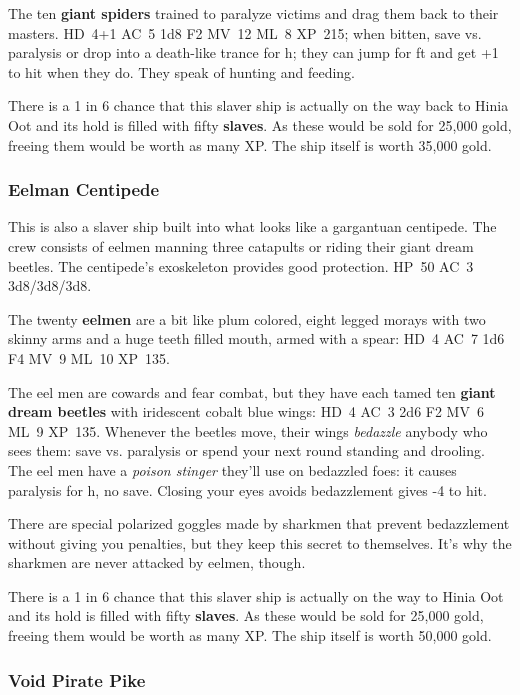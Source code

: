 \documentclass[11pt]{bxart}
\begin{document}
The ten \textbf{giant spiders} trained to paralyze victims and drag
them back to their masters. HD~4+1 AC~5 1d8 F2 MV~12 ML~8 XP~215; when
bitten, save vs. paralysis or drop into a death-like trance for \unit[6]{h};
they can jump for \unit[20]{ft} and get +1 to hit when they do. They speak of
hunting and feeding.

There is a 1 in 6 chance that this slaver ship is actually on the way
back to Hinia Oot and its hold is filled with fifty \textbf{slaves}.
As these would be sold for 25,000 gold, freeing them would be worth as
many XP. The ship itself is worth 35,000 gold.

\subsubsection{Eelman Centipede}

This is also a slaver ship built into what looks like a gargantuan
centipede. The crew consists of eelmen manning three catapults or
riding their giant dream beetles. The centipede's exoskeleton provides
good protection. HP~50 AC~3 3d8/3d8/3d8.

The twenty \textbf{eelmen} are a bit like plum colored, eight legged
morays with two skinny arms and a huge teeth filled mouth, armed with
a spear: HD~4 AC~7 1d6 F4 MV~9 ML~10 XP~135.

The eel men are cowards and fear combat, but they have each tamed ten
\textbf{giant dream beetles} with iridescent cobalt blue wings: HD~4
AC~3 2d6 F2 MV~6 ML~9 XP~135. Whenever the beetles move, their wings
\textit{bedazzle} anybody who sees them: save vs. paralysis or spend
your next round standing and drooling. The eel men have a
\textit{poison stinger} they'll use on bedazzled foes: it causes
paralysis for \unit[1]{h}, no save. Closing your eyes avoids bedazzlement gives
-4 to hit.

There are special polarized goggles made by sharkmen that prevent
bedazzlement without giving you penalties, but they keep this secret
to themselves. It's why the sharkmen are never attacked by eelmen,
though.

There is a 1 in 6 chance that this slaver ship is actually on the way
to Hinia Oot and its hold is filled with fifty \textbf{slaves}. As
these would be sold for 25,000 gold, freeing them would be worth as
many XP. The ship itself is worth 50,000 gold.

\subsubsection{Void Pirate Pike}
\end{document}
